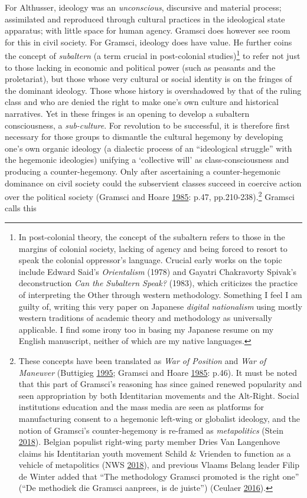 \documentclass[10pt,british,A4paper,,openany]{memoir}
\begin{document}
For Althusser, ideology was an \emph{unconscious}, discursive and
material process; assimilated and reproduced through cultural practices
in the ideological state apparatus; with little space for human agency.
Gramsci does however see room for this in civil society. For Gramsci,
ideology does have value. He further coins the concept of
\emph{subaltern} (a term crucial in post-colonial studies)\footnote{In
  post-colonial theory, the concept of the subaltern refers to those in
  the margins of colonial society, lacking of agency and being forced to
  resort to speak the colonial oppressor's language. Crucial early works
  on the topic include Edward Said's \emph{Orientalism} (1978) and
  Gayatri Chakravorty Spivak's deconstruction \emph{Can the Subaltern
  Speak?} (1983), which criticizes the practice of interpreting the
  Other through western methodology. Something I feel I am guilty of,
  writing this very paper on Japanese \emph{digital nationalism} using
  mostly western traditions of academic theory and methodology as
  universally applicable. I find some irony too in basing my Japanese
  resume on my English manuscript, neither of which are my native
  languages.} to refer not just to those lacking in economic and
political power (such as peasants and the proletariat), but those whose
very cultural or social identity is on the fringes of the dominant
ideology. Those whose history is overshadowed by that of the ruling
class and who are denied the right to make one's own culture and
historical narratives. Yet in these fringes is an opening to develop a
subaltern consciousness, a \emph{sub-culture}. For revolution to be
successful, it is therefore first necessary for those groups to
dismantle the cultural hegemony by developing one's own organic ideology
(a dialectic process of an ``ideological struggle'' with the hegemonic
ideologies) unifying a `collective will' as class-consciousness and
producing a counter-hegemony. Only after ascertaining a
counter-hegemonic dominance on civil society could the subservient
classes succeed in coercive action over the political society (Gramsci
and Hoare \protect\hyperlink{ref-gramsci_selections_1985}{1985}: p.47,
pp.210-238).\footnote{These concepts have been translated as \emph{War
  of Position} and \emph{War of Maneuver} (Buttigieg
  \protect\hyperlink{ref-buttigieg_gramsci_1995}{1995}; Gramsci and
  Hoare \protect\hyperlink{ref-gramsci_selections_1985}{1985}: p.46). It
  must be noted that this part of Gramsci's reasoning has since gained
  renewed popularity and seen appropriation by both Identitarian
  movements and the Alt-Right. Social institutions education and the
  mass media are seen as platforms for manufacturing consent to a
  hegemonic left-wing or globalist ideology, and the notion of Gramsci's
  counter-hegemony is re-framed as \emph{metapolitics} (Stein
  \protect\hyperlink{ref-stein_jeff_2018}{2018}). Belgian populist
  right-wing party member Dries Van Langenhove claims his Identitarian
  youth movement Schild \& Vrienden to function as a vehicle of
  metapolitics (NWS \protect\hyperlink{ref-nws_van_2018}{2018}), and
  previous Vlaams Belang leader Filip de Winter added that ``The
  methodology Gramsci promoted is the right one'' (``De methodiek die
  Gramsci aanprees, is de juiste'') (Ceulaer
  \protect\hyperlink{ref-ceulaer_6_2016}{2016}).} Gramsci calls this
\end{document}
